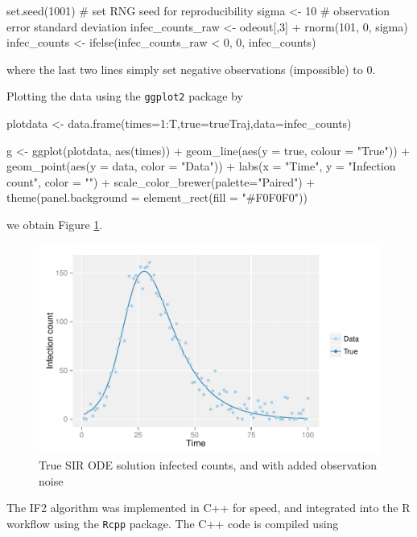 \documentclass[12pt]{article}
\begin{document}
    \begin{R}
    set.seed(1001)  # set RNG seed for reproducibility
    sigma <- 10      # observation error standard deviation
    infec_counts_raw <- odeout[,3] + rnorm(101, 0, sigma)
    infec_counts     <- ifelse(infec_counts_raw < 0, 0, infec_counts)
    \end{R}

    where the last two lines simply set negative observations (impossible) to 0.

    Plotting the data using the \verb|ggplot2| package by

    \begin{R}
    plotdata <- data.frame(times=1:T,true=trueTraj,data=infec_counts)

	  g <- ggplot(plotdata, aes(times)) +
	        geom_line(aes(y = true, colour = "True")) +
	        geom_point(aes(y = data, color = "Data")) +
	        labs(x = "Time", y = "Infection count", color = "") +
	        scale_color_brewer(palette="Paired") +
	        theme(panel.background = element_rect(fill = "#F0F0F0"))
    \end{R}

    we obtain Figure \ref{dataplot}.

    \begin{figure}[H]
        \centering
        \includegraphics[width=\textwidth]{./images/dataplot.pdf}
        \caption{True SIR ODE solution infected counts, and with added observation noise}
        \label{dataplot}
    \end{figure}

    The IF2 algorithm was implemented in C++ for speed, and integrated into the R workflow using the \verb|Rcpp| package. The C++ code is compiled using
\end{document}

